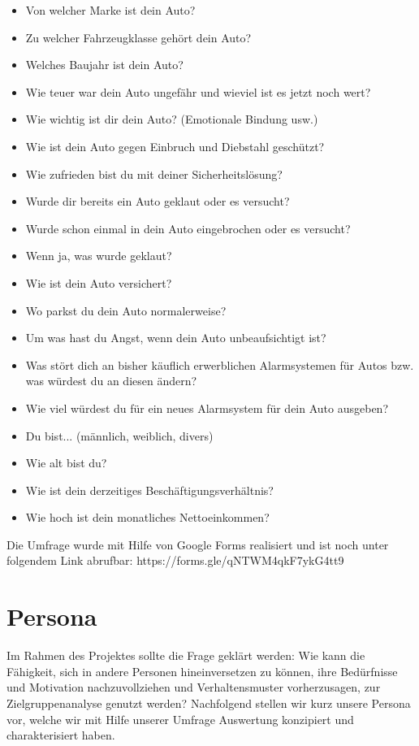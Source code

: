 \begin{itemize}
	\item Von welcher Marke ist dein Auto?
	\item Zu welcher Fahrzeugklasse gehört dein Auto?
	\item Welches Baujahr ist dein Auto?
	\item Wie teuer war dein Auto ungefähr und wieviel ist es jetzt noch wert?
	\item Wie wichtig ist dir dein Auto? (Emotionale Bindung usw.)
	\item Wie ist dein Auto gegen Einbruch und Diebstahl geschützt?
	\item Wie zufrieden bist du mit deiner Sicherheitslösung?
	\item Wurde dir bereits ein Auto geklaut oder es versucht?
	\item Wurde schon einmal in dein Auto eingebrochen oder es versucht?
	\item Wenn ja, was wurde geklaut?
	\item Wie ist dein Auto versichert?
	\item Wo parkst du dein Auto normalerweise?
	\item Um was hast du Angst, wenn dein Auto unbeaufsichtigt ist?
	\item Was stört dich an bisher käuflich erwerblichen Alarmsystemen für Autos bzw. was würdest du an diesen ändern?
	\item Wie viel würdest du für ein neues Alarmsystem für dein Auto ausgeben?
	\item Du bist... (männlich, weiblich, divers)
	\item Wie alt bist du?
	\item Wie ist dein derzeitiges Beschäftigungsverhältnis?
	\item Wie hoch ist dein monatliches Nettoeinkommen?
\end{itemize}
Die Umfrage wurde mit Hilfe von Google Forms realisiert und ist noch unter folgendem Link abrufbar: https://forms.gle/qNTWM4qkF7ykG4tt9

\section{Persona} 
Im Rahmen des Projektes sollte die Frage geklärt werden: Wie kann die Fähigkeit, sich in andere Personen hineinversetzen zu können, ihre Bedürfnisse und Motivation nachzuvollziehen und Verhaltensmuster vorherzusagen, zur Zielgruppenanalyse genutzt werden? \cite{JosefineLepzien} Nachfolgend stellen wir kurz unsere Persona vor, welche wir mit Hilfe unserer Umfrage Auswertung konzipiert und charakterisiert haben. 

